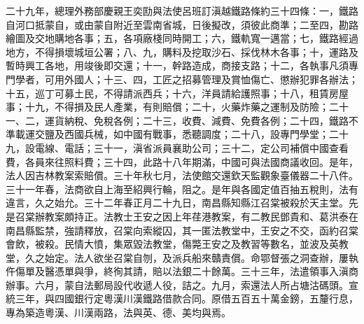 \begin{pinyinscope}
二十九年，總理外務部慶親王奕劻與法使呂班訂滇越鐵路條約三十四條：一，鐵路自河口抵蒙自，或由蒙自附近至雲南省城，日後擬改，須彼此商準；二至四，勘路繪圖及交地購地各事；五，各項廠棧同時開工；六，鐵軌寬一邁當；七，鐵路經過地方，不得損壞城垣公署；八、九，購料及挖取沙石、採伐林木各事；十，運路及暫時興工各地，用竣後即交還；十一，幹路造成，商接支路；十二，各執事凡須專門學者，可用外國人；十三、四，工匠之招募管理及賞恤傷亡、懲辦犯罪各辦法；十五，巡丁可募土民，不得請派西兵；十六，洋員請給護照事；十八，租賃房屋事；十九，不得損及民人產業，有則賠償；二十，火藥炸藥之運制及防險；二十一、二，運貨納稅、免稅各例；二十三，收費、減費、免費各例；二十四，鐵路不準載運交鹽及西國兵械，如中國有戰事，悉聽調度；二十八，設專門學堂；二十九，設電線、電話；三十一，滇省派員襄助公司；三十二，定公司補償中國查看費，各員來往照料費；三十四，此路十八年期滿，中國可與法國商議收回。是年，法人因吉林教案索賠償。三十年秋七月，法使館交還欽天監觀象臺儀器二十八件。三十一年春，法商欲自上海至紹興行輪，阻之。是年與各國定值百抽五稅則，法有違言，久之始允。三十二年春正月二十九日，南昌縣知縣江召棠被殺於天主堂。先是召棠辦教案頗持正。法教士王安之因上年荏港教案，有二教民鄧貴和、葛洪泰在南昌縣監禁，強請釋放，召棠向索縱囚，其一匿法教堂中，王安之不交，函約召棠會飲，被殺。民情大憤，集眾毀法教堂，傷斃王安之及教習等數名，並波及英教堂，久之始定。法人欲坐召棠自刎，及派兵船來贛責償。命鄂督張之洞查辦，屢執仵傷單及醫憑單與爭，終徇其請，賠以法銀二十餘萬。三十三年，法遣領事入滇商辦事。六月，蒙自法郵局設代收遞人役，詰之。九月，索還法人所占塘沽碼頭。宣統三年，與四國銀行定粵漢川漢鐵路借款合同。原借五百五十萬金鎊，五釐行息，專為築造粵漢、川漢兩路，法與英、德、美均與焉。


\end{pinyinscope}